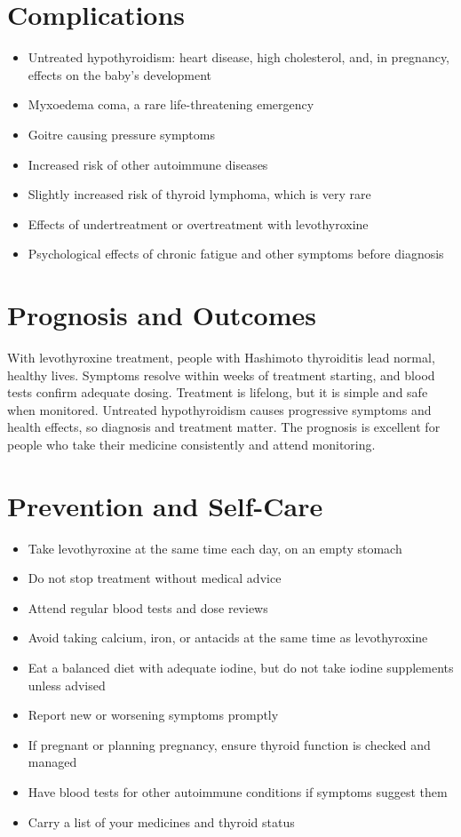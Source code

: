 \section*{Complications}
\begin{itemize}
    \item Untreated hypothyroidism: heart disease, high cholesterol, and, in pregnancy, effects on the baby's development
    \item Myxoedema coma, a rare life-threatening emergency
    \item Goitre causing pressure symptoms
    \item Increased risk of other autoimmune diseases
    \item Slightly increased risk of thyroid lymphoma, which is very rare
    \item Effects of undertreatment or overtreatment with levothyroxine
    \item Psychological effects of chronic fatigue and other symptoms before diagnosis
\end{itemize}

\section*{Prognosis and Outcomes}
With levothyroxine treatment, people with Hashimoto thyroiditis lead normal, healthy lives. Symptoms resolve within weeks of treatment starting, and blood tests confirm adequate dosing. Treatment is lifelong, but it is simple and safe when monitored. Untreated hypothyroidism causes progressive symptoms and health effects, so diagnosis and treatment matter. The prognosis is excellent for people who take their medicine consistently and attend monitoring.

\section*{Prevention and Self-Care}
\begin{itemize}
    \item Take levothyroxine at the same time each day, on an empty stomach
    \item Do not stop treatment without medical advice
    \item Attend regular blood tests and dose reviews
    \item Avoid taking calcium, iron, or antacids at the same time as levothyroxine
    \item Eat a balanced diet with adequate iodine, but do not take iodine supplements unless advised
    \item Report new or worsening symptoms promptly
    \item If pregnant or planning pregnancy, ensure thyroid function is checked and managed
    \item Have blood tests for other autoimmune conditions if symptoms suggest them
    \item Carry a list of your medicines and thyroid status
\end{itemize}


